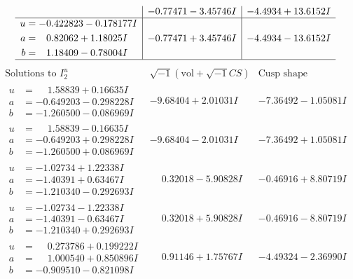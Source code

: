 \documentclass[1p]{elsarticle_modified}
\theoremstyle{definition}
\newcommand{\I}{\sqrt{-1}}
\begin{document}
$$\begin{array}{c|c|c}
 & -0.77471 - 3.45746 I & -4.4934 + 13.6152 I \\ \hline\begin{aligned}
u &= -0.422823 - 0.178177 I \\
a &= \phantom{-}0.82062 + 1.18025 I \\
b &= \phantom{-}1.18409 - 0.78004 I\end{aligned}
 & -0.77471 + 3.45746 I & -4.4934 - 13.6152 I\\
 \hline 
 \end{array}$$\newpage$$\begin{array}{c|c|c}  
\text{Solutions to }I^u_{2}& \I (\text{vol} + \sqrt{-1}CS) & \text{Cusp shape}\\
 \hline 
\begin{aligned}
u &= \phantom{-}1.58839 + 0.16635 I \\
a &= -0.649203 - 0.298228 I \\
b &= -1.260500 - 0.086969 I\end{aligned}
 & -9.68404 + 2.01031 I & -7.36492 - 1.05081 I \\ \hline\begin{aligned}
u &= \phantom{-}1.58839 - 0.16635 I \\
a &= -0.649203 + 0.298228 I \\
b &= -1.260500 + 0.086969 I\end{aligned}
 & -9.68404 - 2.01031 I & -7.36492 + 1.05081 I \\ \hline\begin{aligned}
u &= -1.02734 + 1.22338 I \\
a &= -1.40391 + 0.63467 I \\
b &= -1.210340 - 0.292693 I\end{aligned}
 & \phantom{-}0.32018 - 5.90828 I & -0.46916 + 8.80719 I \\ \hline\begin{aligned}
u &= -1.02734 - 1.22338 I \\
a &= -1.40391 - 0.63467 I \\
b &= -1.210340 + 0.292693 I\end{aligned}
 & \phantom{-}0.32018 + 5.90828 I & -0.46916 - 8.80719 I \\ \hline\begin{aligned}
u &= \phantom{-}0.273786 + 0.199222 I \\
a &= \phantom{-}1.000540 + 0.850896 I \\
b &= -0.909510 - 0.821098 I\end{aligned}
 & \phantom{-}0.91146 + 1.75767 I & -4.49324 - 2.36990 I \\ \hline\begin{aligned}

\end{aligned}
\end{array}$$
\end{document}
